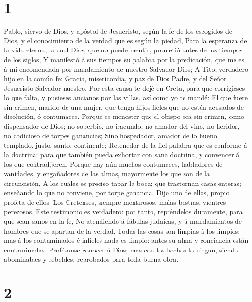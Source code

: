 \hypertarget{section}{%
\section{1}\label{section}}

 Pablo, siervo de Dios, y apóstol de Jesucristo, según la fe
de los escogidos de Dios, y el conocimiento de la verdad que es según la
piedad,  Para la esperanza de la vida eterna, la cual Dios,
que no puede mentir, prometió antes de los tiempos de los siglos,
 Y manifestó á sus tiempos su palabra por la predicación,
que me es á mí encomendada por mandamiento de nuestro Salvador Dios;
 A Tito, verdadero hijo en la común fe: Gracia,
misericordia, y paz de Dios Padre, y del Señor Jesucristo Salvador
nuestro.  Por esta causa te dejé en Creta, para que
corrigieses lo que falta, y pusieses ancianos por las villas, así como
yo te mandé:  El que fuere sin crimen, marido de una mujer,
que tenga hijos fieles que no estén acusados de disolución, ó
contumaces.  Porque es menester que el obispo sea sin
crimen, como dispensador de Dios; no soberbio, no iracundo, no amador
del vino, no heridor, no codicioso de torpes ganancias; 
Sino hospedador, amador de lo bueno, templado, justo, santo, continente;
 Retenedor de la fiel palabra que es conforme á la doctrina:
para que también pueda exhortar con sana doctrina, y convencer á los que
contradijeren.  Porque hay aún muchos contumaces,
habladores de vanidades, y engañadores de las almas, mayormente los que
son de la circuncisión,  A los cuales es preciso tapar la
boca; que trastornan casas enteras; enseñando lo que no conviene, por
torpe ganancia.  Dijo uno de ellos, propio profeta de
ellos: Los Cretenses, siempre mentirosos, malas bestias, vientres
perezosos.  Este testimonio es verdadero: por tanto,
repréndelos duramente, para que sean sanos en la fe,  No
atendiendo á fábulas judaicas, y á mandamientos de hombres que se
apartan de la verdad.  Todas las cosas son limpias á los
limpios; mas á los contaminados é infieles nada es limpio: antes su alma
y conciencia están contaminadas.  Profésanse conocer á
Dios; mas con los hechos lo niegan, siendo abominables y rebeldes,
reprobados para toda buena obra.

\hypertarget{section-1}{%
\section{2}\label{section-1}}

